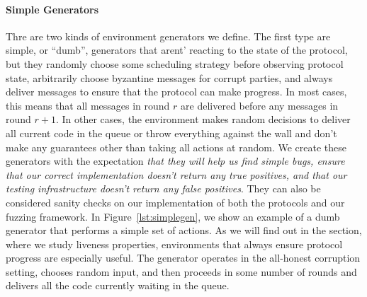 
\begin{figure*}

\caption{A simple ``dumb'' generator that doesn't to any protocol specific work or targetting, but just loops and schedules message delive}
\label{lst:simplegen}
\end{figure*}

\paragraph{Simple Generators}
Thre are two kinds of environment generators we define.
The first type are simple, or ``dumb'', generators that arent' reacting to the state of the protocol, but they randomly choose some scheduling strategy before observing protocol state, arbitrarily choose byzantine messages for corrupt parties, and always deliver messages to ensure that the protocol can make progress. 
In most cases, this means that all messages in round $r$ are delivered before any messages in round $r+1$.
In other cases, the environment makes random decisions to deliver all current code in the queue or throw everything against the wall and don't make any guarantees other than taking all actions at random.
We create these generators with the expectation \emph{that they will help us find simple bugs, ensure that our correct implementation doesn't return any true positives, and that our testing infrastructure doesn't return any false positives}.
They can also be considered sanity checks on our implementation of both the protocols and our fuzzing framework.
In Figure~\ref{lst:simplegen}, we show an example of a dumb generator that performs a simple set of actions.
As we will find out in the section, where we study liveness properties, environments that always ensure protocol progress are especially useful. 
The generator operates in the all-honest corruption setting, chooses random input, and then proceeds in some number of rounds and delivers all the code currently waiting in the queue.


